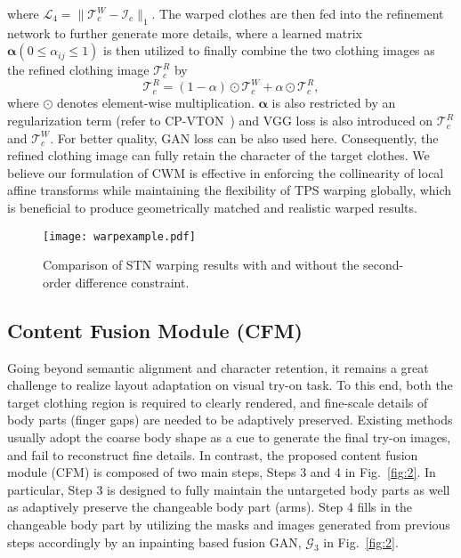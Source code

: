 \documentclass[10pt,twocolumn,letterpaper]{article}
\begin{document}
where $\mathcal{L}_{4} =\lVert \mathcal{T}^{W}_{c}-\mathcal{I}_{c}\rVert_1 $. The warped clothes are then fed into the refinement network to further generate more details, where a learned matrix $\mathbf{{\alpha}} (0 \leq {\alpha}_{ij} \leq 1)$ is then utilized to finally combine the two clothing  images as the refined clothing  image $\mathcal{T}^{R}_{c}$ by
\begin{equation}
    \mathcal{T}^{R}_{c}=(1-\alpha)\odot\mathcal{T}^{W}_{c}+\alpha \odot\mathcal{T}^{R}_{c},
\label{refineclothes}
\end{equation}
where $\odot$ denotes element-wise multiplication. $\mathbf{{\alpha}}$ is also restricted by an regularization term (refer to CP-VTON~\cite{DBLP:conf/eccv/WangZLCLY18}) and VGG loss is also introduced on $\mathcal{T}^{R}_{c}$ and $\mathcal{T}^{W}_{c}$. For better quality, GAN loss can be also used here.
Consequently, the refined clothing image can fully retain the character of the target clothes.
We believe our formulation of CWM
is effective in enforcing the collinearity of local affine transforms while maintaining the flexibility of TPS warping globally, which is beneficial to produce geometrically matched and realistic warped results.




\begin{figure}[t]
\begin{center}
\texttt{[image: warpexample.pdf]}
\vspace{-10pt}
\end{center}
   \caption{\footnotesize Comparison of STN warping results with and without the second-order difference  constraint.}
\label{fig:warpexample}
\vspace{-10pt}
\end{figure}

\subsection{Content Fusion Module (CFM)}
Going beyond semantic alignment and character retention, it remains a great challenge to realize layout adaptation on visual try-on task. To this end, both the target clothing region is required to clearly rendered, and fine-scale details of body parts (\ie finger gaps) are needed to be adaptively preserved.
Existing methods usually adopt the coarse body shape as a cue to generate the final try-on images, and fail to reconstruct fine details.
In contrast, the proposed content fusion module (CFM) is composed of two main steps, \ie Steps 3 and 4 in Fig.~\ref{fig:2}. In particular, Step 3 is designed to fully maintain the untargeted body parts as well as adaptively preserve the changeable body part (\ie arms). Step 4 fills in the changeable body part by utilizing the masks and images generated from previous steps accordingly by an inpainting based fusion GAN, $\mathcal{G}_3$ in Fig.~\ref{fig:2}.
\end{document}
